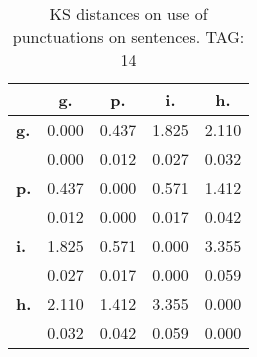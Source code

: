 \begin{table}[h!]
\begin{center}
\begin{tabular}{| l || c | c | c | c |}\hline
 & {\bf g.} & {\bf p.} & {\bf i.} & {\bf h.} \\\hline\hline
{\bf g.} & 0.000 & 0.437 & 1.825 & 2.110 \\
{\bf } & 0.000 & 0.012 & 0.027 & 0.032 \\\hline
{\bf p.} & 0.437 & 0.000 & 0.571 & 1.412 \\
{\bf } & 0.012 & 0.000 & 0.017 & 0.042 \\\hline
{\bf i.} & 1.825 & 0.571 & 0.000 & 3.355 \\
{\bf } & 0.027 & 0.017 & 0.000 & 0.059 \\\hline
{\bf h.} & 2.110 & 1.412 & 3.355 & 0.000 \\
{\bf } & 0.032 & 0.042 & 0.059 & 0.000 \\\hline
\end{tabular}
\caption{KS distances on use of punctuations on sentences. TAG: 14}
\end{center}
\end{table}